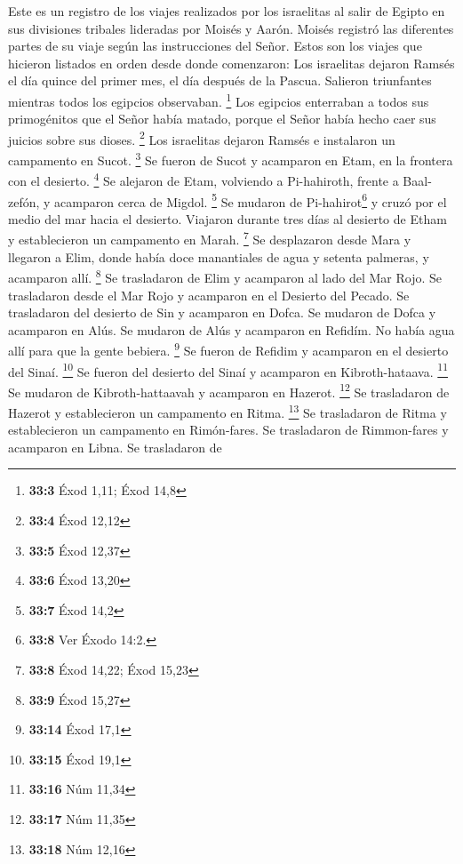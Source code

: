  Este es un registro de los viajes realizados por los
israelitas al salir de Egipto en sus divisiones tribales lideradas por
Moisés y Aarón.  Moisés registró las diferentes partes de
su viaje según las instrucciones del Señor. Estos son los viajes que
hicieron listados en orden desde donde comenzaron:  Los
israelitas dejaron Ramsés el día quince del primer mes, el día después
de la Pascua. Salieron triunfantes mientras todos los egipcios
observaban. \footnote{\textbf{33:3} Éxod 1,11; Éxod 14,8} 
Los egipcios enterraban a todos sus primogénitos que el Señor había
matado, porque el Señor había hecho caer sus juicios sobre sus dioses.
\footnote{\textbf{33:4} Éxod 12,12}  Los israelitas
dejaron Ramsés e instalaron un campamento en Sucot. \footnote{\textbf{33:5}
  Éxod 12,37}  Se fueron de Sucot y acamparon en Etam, en
la frontera con el desierto. \footnote{\textbf{33:6} Éxod 13,20}
 Se alejaron de Etam, volviendo a Pi-hahiroth, frente a
Baal-zefón, y acamparon cerca de Migdol. \footnote{\textbf{33:7} Éxod
  14,2}  Se mudaron de Pi-hahirot\footnote{\textbf{33:8}
  Ver Éxodo 14:2.} y cruzó por el medio del mar hacia el desierto.
Viajaron durante tres días al desierto de Etham y establecieron un
campamento en Marah. \footnote{\textbf{33:8} Éxod 14,22; Éxod 15,23}
 Se desplazaron desde Mara y llegaron a Elim, donde había
doce manantiales de agua y setenta palmeras, y acamparon allí.
\footnote{\textbf{33:9} Éxod 15,27}  Se trasladaron de
Elim y acamparon al lado del Mar Rojo.  Se trasladaron
desde el Mar Rojo y acamparon en el Desierto del Pecado. 
Se trasladaron del desierto de Sin y acamparon en Dofca. 
Se mudaron de Dofca y acamparon en Alús.  Se mudaron de
Alús y acamparon en Refidím. No había agua allí para que la gente
bebiera. \footnote{\textbf{33:14} Éxod 17,1}  Se fueron
de Refidim y acamparon en el desierto del Sinaí. \footnote{\textbf{33:15}
  Éxod 19,1}  Se fueron del desierto del Sinaí y
acamparon en Kibroth-hataava. \footnote{\textbf{33:16} Núm 11,34}
 Se mudaron de Kibroth-hattaavah y acamparon en Hazerot.
\footnote{\textbf{33:17} Núm 11,35}  Se trasladaron de
Hazerot y establecieron un campamento en Ritma. \footnote{\textbf{33:18}
  Núm 12,16}  Se trasladaron de Ritma y establecieron un
campamento en Rimón-fares.  Se trasladaron de
Rimmon-fares y acamparon en Libna.  Se trasladaron de
